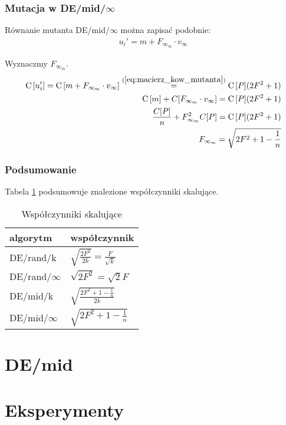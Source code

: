 \subsection{Mutacja w DE/mid/$\infty$}

Równanie mutanta DE/mid/$\infty$ można zapisać podobnie:
\begin{align*}
u_i' = m + F_{\infty_m} \cdot v_\infty
\end{align*}

Wyznaczmy $F_{\infty_m}$.
\begin{align*}
{\rm C}\,[u_i'] = {\rm C}\,[m + F_{\infty_m} \cdot v_\infty] \overset{(\ref{eq:macierz_kow_mutanta})}{=} {\rm C}\,[P](2F^2 + 1) \\
{\rm C}\,[m] + C[F_{\infty_m} \cdot v_\infty] = {\rm C}\,[P](2F^2 + 1) \\
\frac{C[P]}{n} + F_{\infty_m}^2 C[P] = {\rm C}\,[P](2F^2 + 1) \\
F_{\infty_m} = \sqrt{2F^2 + 1 - \frac{1}{n}}
\end{align*}

\subsection{Podsumowanie}

Tabela \ref{table:parametry} podsumowuje znalezione współczynniki skalujące.

\begin{table}[H]
\centering
\begin{tabular}{ l | l }
algorytm         & współczynnik \\ \hline
DE/rand/k        & $\sqrt{\frac{2F^2}{2k}} = \frac{F}{\sqrt{k}}$ \\ 
DE/rand/$\infty$ & $\sqrt{2F^2} = \sqrt{2}F$ \\ \hline
DE/mid/k         & $\sqrt{\frac{2F^2 + 1 - \frac{1}{n}}{2k}}$ \\
DE/mid/$\infty$  & $\sqrt{2F^2 + 1 - \frac{1}{n}}$ \\
\end{tabular}
\caption{Współczynniki skalujące}
\label{table:parametry}
\end{table}

\chapter{DE/mid}

\chapter{Eksperymenty}

